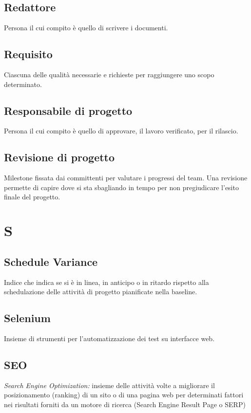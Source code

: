 \subsection*{Redattore}
Persona il cui compito è quello di scrivere i documenti.

\subsection*{Requisito}
Ciascuna delle qualità necessarie e richieste per raggiungere uno scopo determinato.

\subsection*{Responsabile di progetto}
Persona il cui compito è quello di approvare, il lavoro verificato, per il rilascio.

\subsection*{Revisione di progetto}
Milestone fissata dai committenti per valutare i progressi del team. Una revisione permette di capire dove si sta sbagliando in tempo per non pregiudicare l'esito finale del progetto.

\newpage
\section{S}
\subsection*{Schedule Variance}
Indice che indica se si è in linea, in anticipo o in ritardo rispetto alla schedulazione delle attività di progetto pianificate nella baseline.

\subsection*{Selenium}
Insieme di strumenti per l'automatizzazione dei test su interfacce web.

\subsection*{SEO}
\textit{Search Engine Optimization:} insieme delle attività volte a migliorare il posizionamento (ranking) di un sito o di una pagina web per determinati fattori nei risultati forniti
da un motore di ricerca (Search Engine Result Page o SERP)

